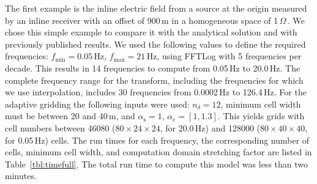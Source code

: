\documentclass[extra, camera,%
]{gji}
\newcommand{\mr}[1]{\mathrm{#1}}
\newcommand{\ohmm}{\ensuremath{\Omega\,}\text{m}\xspace}
\begin{document}
The first example is the inline electric field from a source at the origin
measured by an inline receiver with an offset of 900\,m in a homogeneous space
of 1\,\ohmm. We chose this simple example to compare it with the analytical
solution and with previously published results. We used the following values to
define the required frequencies: $f_\mr{min}=0.05\,$Hz, $f_\mr{max}=21\,$Hz,
using FFTLog with 5 frequencies per decade. This results in 14 frequencies to
compute from 0.05\,Hz to 20.0\,Hz. The complete frequency range for the
transform, including the frequencies for which we use interpolation, includes
30 frequencies from 0.0002\,Hz to 126.4\,Hz. For the adaptive gridding the
following inputs were used: $n_\delta=12$, minimum cell width must be between
20 and 40\,m, and $\alpha_\mr{s}=1$, $\alpha_\mr{c}=[1,1.3]$. This yields grids
with cell numbers between \num{46080} ($80\times24\times24$, for 20.0\,Hz) and
\num{128000} ($80\times40\times40$, for 0.05\,Hz) cells. The run times for each
frequency, the corresponding number of cells, minimum cell width, and
computation domain stretching factor are listed in Table~\ref{tbl:timefull}.
The total run time to compute this model was less than two minutes.
%
\end{document}
